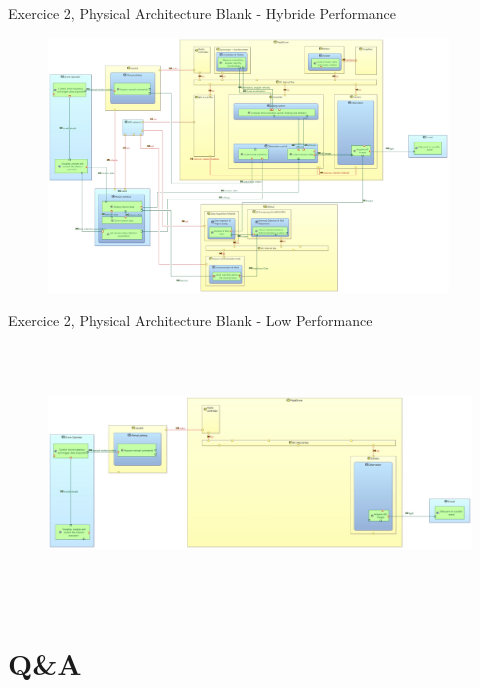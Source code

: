 \documentclass[aspectratio=1610]{beamer}
\begin{document}
    \begin{frame}{Exercice 2, Physical Architecture Blank - Hybride Performance}
        \begin{figure}[H]
            \centering
            \includegraphics[width=\textwidth, height=6.75cm, keepaspectratio]{./images/EX2/CSC_5RO08_TA_EX2_PAB_Hybride.jpg}
        \end{figure}
    \end{frame}
    \begin{frame}{Exercice 2, Physical Architecture Blank - Low Performance}
        \begin{figure}[H]
            \centering
            \includegraphics[width=\textwidth, height=6.75cm, keepaspectratio]{./images/EX2/CSC_5RO08_TA_EX2_PAB_Low.jpg}
        \end{figure}
    \end{frame}


    \section*{Q\&A}

    \maketitle
\end{document}
